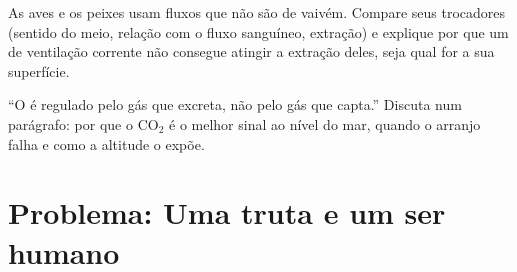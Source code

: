 \begin{exercise}[$\star\star\star$]\label{exo:b1:gas-exchange:11}
As aves e os peixes usam fluxos que não são de vaivém. Compare seus
trocadores (sentido do meio, relação com o fluxo sanguíneo, extração)
e explique por que um  de ventilação corrente não consegue
atingir a extração deles, seja qual for a sua superfície.
\end{exercise}

\begin{exercise}[$\star\star\star$]\label{exo:b1:gas-exchange:12}
``O  é regulado pelo gás que excreta, não pelo gás que capta.''
Discuta num parágrafo: por que o $\mathrm{CO_2}$ é o melhor sinal ao
nível do mar, quando o arranjo falha e como a altitude o expõe.
\end{exercise}

\section{Problema: Uma truta e um ser humano}


